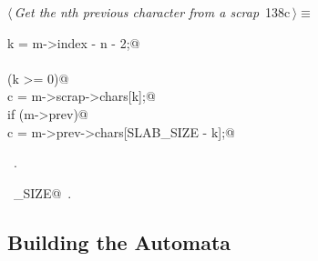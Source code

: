 \documentclass[a4paper]{report}
\begin{document}
\begin{flushleft} \small
\begin{minipage}{\linewidth}\label{scrap302}\raggedright\small
{} $\langle\,${\it Get the nth previous character from a scrap}\nobreak\ {\footnotesize {138c}}$\,\rangle\equiv$
\vspace{-1ex}
\begin{list}{}{} \item
\mbox{}\verb@int k = m->index - n - 2;@\\
\mbox{}\verb@@\\
\mbox{}\verb@if (k >= 0)@\\
\mbox{}\verb@   c = m->scrap->chars[k];@\\
\mbox{}\verb@else if (m->prev)@\\
\mbox{}\verb@   c = m->prev->chars[SLAB_SIZE - k];@\\
\mbox{}\verb@@{\NWsep}
\end{list}
\vspace{-1.5ex}
\footnotesize
\begin{list}{}{\setlength{\itemsep}{-\parsep}\setlength{\itemindent}{-\leftmargin}}
\item \NWtxtMacroRefIn\ .
\item \NWtxtIdentsUsed\nobreak\  \verb@SLAB_SIZE@\nobreak\ .
\item{}
\end{list}
\end{minipage}\vspace{4ex}
\end{flushleft}
\subsection{Building the Automata}
\end{document}
